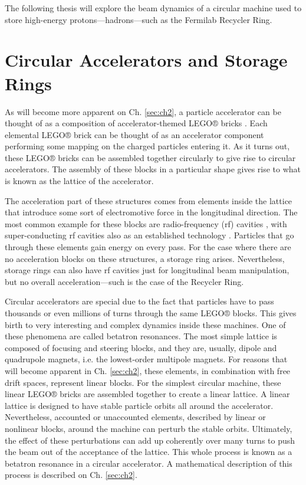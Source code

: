 The following thesis will explore the beam dynamics of a circular machine used to store high-energy protons---hadrons---such as the Fermilab Recycler Ring.         

\section{Circular Accelerators and Storage Rings}

As will become more apparent on Ch. \ref{sec:ch2}, a particle accelerator can be thought of as a composition of accelerator-themed LEGO® bricks \cite{forest}. Each elemental LEGO® brick can be thought of as an accelerator component performing some mapping on the charged particles entering it. As it turns out, these LEGO® bricks can be assembled together circularly to give rise to circular accelerators. The assembly of these blocks in a particular shape gives rise to what is known as the lattice of the accelerator.

The acceleration part of these structures comes from elements inside the lattice that introduce some sort of electromotive force in the longitudinal direction. The most common example for these blocks are radio-frequency (rf) cavities \cite{sylee}, with super-conducting rf cavities also as an established technology \cite{srfcavs}. Particles that go through these elements gain energy on every pass. For the case where there are no acceleration blocks on these structures, a storage ring arises. Nevertheless, storage rings can also have rf cavities just for longitudinal beam manipulation, but no overall acceleration---such is the case of the Recycler Ring.    

Circular accelerators are special due to the fact that particles have to pass thousands or even millions of turns through the same LEGO® blocks. This gives birth to very interesting and complex dynamics inside these machines. One of these phenomena are called betatron resonances. The most simple lattice is composed of focusing and steering blocks, and they are, usually, dipole and quadrupole magnets, i.e. the lowest-order multipole magnets. For reasons that will become apparent in Ch. \ref{sec:ch2}, these elements, in combination with free drift spaces, represent linear blocks. For the simplest circular machine, these linear LEGO® bricks are assembled together to create a linear lattice. A linear lattice is designed to have stable particle orbits all around the accelerator. Nevertheless, accounted or unaccounted elements, described by linear or nonlinear blocks, around the machine can perturb the stable orbits. Ultimately, the effect of these perturbations can add up coherently over many turns to push the beam out of the acceptance of the lattice. This whole process is known as a betatron resonance in a circular accelerator. A mathematical description of this process is described on Ch. \ref{sec:ch2}.

